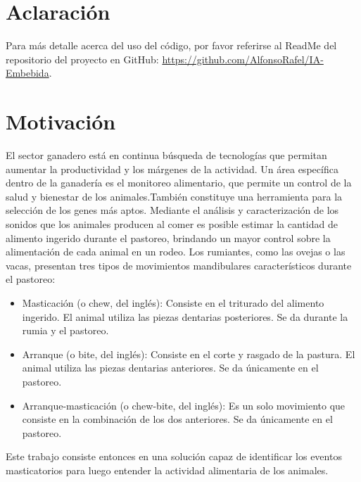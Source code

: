 \documentclass[11pt]{charter}
\begin{document}
\maketitle
\thispagestyle{empty}
\pagebreak


\thispagestyle{empty}
{\setlength{\parskip}{0pt}
\tableofcontents{}
}
\pagebreak

\section{Aclaración}
Para más detalle acerca del uso del código, por favor referirse al ReadMe del repositorio del proyecto en GitHub: \url{https://github.com/AlfonsoRafel/IA-Embebida}.


\section{Motivación}
\label{sec:descripcion}

El sector ganadero está en continua búsqueda de tecnologías que permitan aumentar la productividad y los márgenes de la actividad. Un área específica dentro de la ganadería es el monitoreo alimentario, que permite un control de la salud y bienestar de los animales.También constituye una herramienta para la selección de los genes más aptos.
Mediante el análisis y caracterización de los sonidos que los animales producen al comer es posible estimar la cantidad de alimento ingerido durante el pastoreo, brindando un mayor control sobre la alimentación de cada animal en un rodeo.
Los rumiantes, como las ovejas o las vacas, presentan tres tipos de movimientos
mandibulares característicos durante el pastoreo:
\begin{itemize}
	\item Masticación (o chew, del inglés): Consiste en el triturado del alimento ingerido. El animal utiliza las piezas dentarias posteriores. Se da durante la rumia y el pastoreo.
	\item Arranque (o bite, del inglés): Consiste en el corte y rasgado de la pastura. El animal utiliza las piezas dentarias anteriores. Se da únicamente en el pastoreo.
	\item Arranque-masticación (o chew-bite, del inglés): Es un solo movimiento que consiste en la combinación de los dos anteriores. Se da únicamente en el pastoreo.
 
\end{itemize}

Este trabajo consiste entonces en una solución capaz de identificar los eventos masticatorios para luego entender la actividad alimentaria de los animales.
\end{document}
